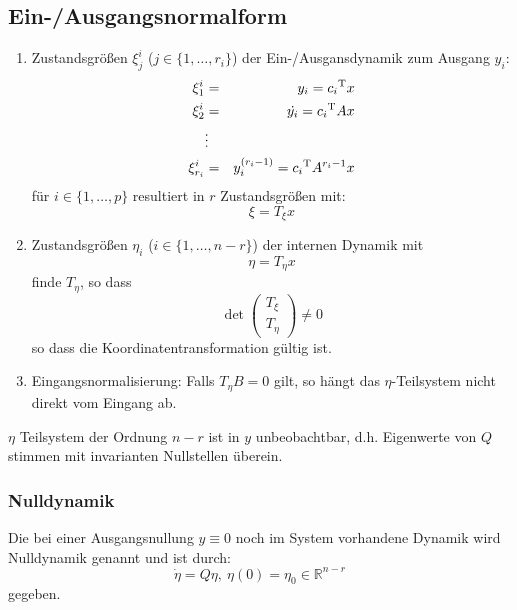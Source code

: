 \subsection{Ein-/Ausgangsnormalform}
\begin{enumerate}
    \item Zustandsgrößen $\xi_j^i$ ($j\in\{1, \ldots, r_i\}$) der Ein-/Ausgansdynamik
        zum Ausgang $y_i$:
        \begin{eqnarray}
            \xi_1^i &=& y_i = {c_i}^\text{T} x \\
            \xi_2^i &=& \dot{y_i} = {c_i}^\text{T} A x \\
            &\vdots& \\
            \xi_{r_i}^i &=& y_i^{(r_i-1)} = {c_i}^\text{T} A^{r_i-1} x
        \end{eqnarray}
        für $i \in \{1, \ldots, p\}$ resultiert in $r$ Zustandsgrößen mit:
        \begin{equation}
            \xi = T_\xi x
        \end{equation}
    \item Zustandsgrößen $\eta_i$ ($i\in\{1, \ldots, n-r\}$) der internen Dynamik mit
        \begin{equation}
            \eta = T_\eta x
        \end{equation}
        finde $T_\eta$, so dass
        \begin{equation}
            \det \begin{pmatrix} T_\xi \\ T_\eta \end{pmatrix} \neq 0
        \end{equation}
        so dass die Koordinatentransformation gültig ist.
    \item Eingangsnormalisierung: Falls $T_\eta B =0$ gilt, so hängt das $\eta$-Teilsystem
        nicht direkt vom Eingang ab.
\end{enumerate}

$\eta$ Teilsystem der Ordnung $n-r$ ist in $y$ unbeobachtbar, d.h. Eigenwerte von
$Q$ stimmen mit invarianten Nullstellen überein.

\subsubsection{Nulldynamik}
Die bei einer Ausgangsnullung $y\equiv 0$ noch im System vorhandene Dynamik wird
Nulldynamik genannt und ist durch:
\begin{equation}
    \dot{\eta} = Q \eta,\ \eta(0) = \eta_0 \in \mathbb{R}^{n-r}
\end{equation}
gegeben.


